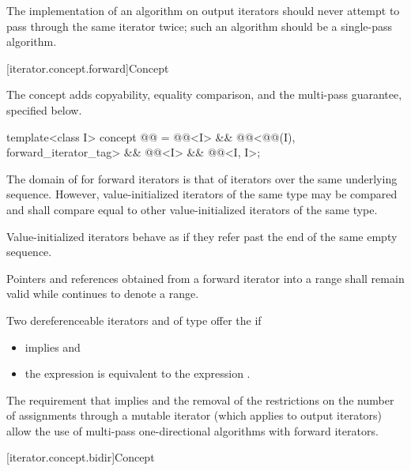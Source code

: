 \pnum
\recommended
The implementation of an algorithm on output iterators
should never attempt to pass through the same iterator twice;
such an algorithm should be a single-pass algorithm.

[iterator.concept.forward]{Concept }

\pnum
The  concept adds
copyability, equality comparison, and
the multi-pass guarantee, specified below.

\begin{codeblock}
template<class I>
  concept @@ =
    @@<I> &&
    @@<@@(I), forward_iterator_tag> &&
    @@<I> &&
    @@<I, I>;
\end{codeblock}

\pnum
The domain of \tcode{==} for forward iterators is that of iterators over the same
underlying sequence. However, value-initialized iterators of the same type
may be compared and shall compare equal to other value-initialized iterators of the same type.
\begin{note}
Value-initialized iterators behave as if they refer past the end of the same
empty sequence.
\end{note}

\pnum
Pointers and references obtained from a forward iterator into a range 
shall remain valid while  continues to denote a range.

\pnum
Two dereferenceable iterators  and  of type 
offer the  if
\begin{itemize}
\item {} implies  and
\item the expression
 is equivalent to the expression .
\end{itemize}

\pnum
\begin{note}
The requirement that
implies
and the removal of the restrictions on the number of assignments through
a mutable iterator
(which applies to output iterators)
allow the use of multi-pass one-directional algorithms with forward iterators.
\end{note}

[iterator.concept.bidir]{Concept }

